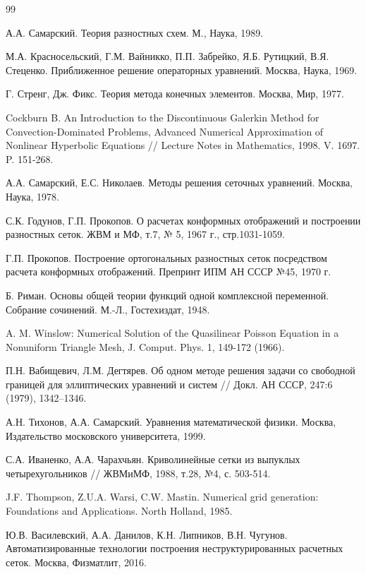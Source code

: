 \documentclass[a4paper,14pt,russian]{extreport}
\renewcommand{\_}{\kern-1.5pt\textunderscore\kern-1.5pt}
\begin{document}
	
\newpage
\begin{thebibliography}{99}

А.А. Самарский. Теория разностных схем. М., Наука, 1989.

М.А. Красносельский, Г.М. Вайникко, П.П. Забрейко, Я.Б. Рутицкий, В.Я. Стеценко. Приближенное решение операторных уравнений. Москва, Наука, 1969.

Г. Стренг, Дж. Фикс. Теория метода конечных элементов. Москва, Мир, 1977.

Cockburn B. An Introduction to the Discontinuous Galerkin Method for Convection-Dominated Problems, Advanced Numerical Approximation of Nonlinear Hyperbolic Equations // Lecture Notes in Mathematics, 1998. V. 1697. P. 151-268.

А.А. Самарский, Е.С. Николаев. Методы решения сеточных уравнений. Москва, Наука, 1978.

С.К. Годунов, Г.П. Прокопов. О расчетах конформных отображений и построении разностных сеток. ЖВМ и МФ, т.7, № 5, 1967 г., стр.1031-1059.

Г.П. Прокопов. Построение ортогональных разностных сеток посредством расчета конформных отображений. Препринт ИПМ АН СССР №45, 1970 г.

Б. Риман. Основы общей теории функций одной комплексной переменной. Собрание сочинений. М.-Л., Гостехиздат, 1948.

A. M. Winslow: Numerical Solution of the Quasilinear Poisson Equation in a Nonuniform Triangle Mesh, J. Comput. Phys. 1, 149-172 (1966).

П.Н. Вабищевич, Л.М. Дегтярев. Об одном методе решения задачи со свободной границей для эллиптических уравнений и систем // Докл. АН СССР, 247:6 (1979), 1342–1346.

А.Н. Тихонов, А.А. Самарский. Уравнения математической физики. Москва, Издательство московского университета, 1999.

С.А. Иваненко, А.А. Чарахчьян. Криволинейные сетки из выпуклых четырехугольников // ЖВМиМФ, 1988, т.28, №4, с. 503-514.

J.F. Thompson, Z.U.A. Warsi, C.W. Mastin. Numerical grid generation: Foundations and Applications. North Holland, 1985.

Ю.В. Василевский, А.А. Данилов, К.Н. Липников, В.Н. Чугунов. Автоматизированные технологии построения неструктурированных расчетных сеток. Москва, Физматлит, 2016.

\end{thebibliography}
\end{document}
